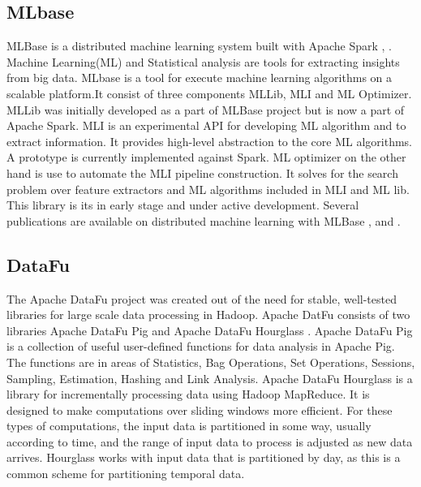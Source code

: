 \subsection{MLbase}
    
    MLBase is a distributed machine learning
    system built with Apache Spark \cite{www-spark}, \cite{www-mlbase}.
    Machine Learning(ML) and Statistical analysis are tools for extracting
    insights from big data.
    MLbase is a tool for execute machine learning
    algorithms on a scalable platform.It consist of three components
    MLLib, MLI and ML Optimizer. MLLib was initially developed as a
    part of MLBase project but is now a part of Apache Spark. MLI is
    an experimental API for developing ML algorithm and to extract
    information. It provides high-level abstraction to the core ML
    algorithms. A prototype is currently implemented against Spark. ML
    optimizer on the other hand is use to automate the MLI pipeline
    construction. It solves for the search problem over feature
    extractors and ML algorithms included in MLI and ML lib. This
    library is its in early stage and under active
    development. Several publications are available on
    distributed machine learning with MLBase \cite{mlbasepub1},
    \cite{mlbasepub2} and \cite{mlbasepub3}.

    \pv


\subsection{DataFu}

    The Apache DataFu project was created out of the need for stable,
    well-tested libraries for large scale data processing in Hadoop.
    Apache DatFu consists of two libraries Apache DataFu Pig and
    Apache DataFu Hourglass \cite{www-DataFu}. Apache
    DataFu Pig is a collection of useful user-defined functions for
    data analysis in Apache Pig. The functions are in areas of
    Statistics, Bag Operations, Set Operations, Sessions, Sampling,
    Estimation, Hashing and Link Analysis.  Apache DataFu Hourglass is
    a library for incrementally processing data using Hadoop
    MapReduce. It is designed to make computations over sliding windows
    more efficient. For these types of computations, the input data is
    partitioned in some way, usually according to time, and the range
    of input data to process is adjusted as new data arrives.
    Hourglass works with input data that is partitioned by day, as
    this is a common scheme for partitioning temporal data.

